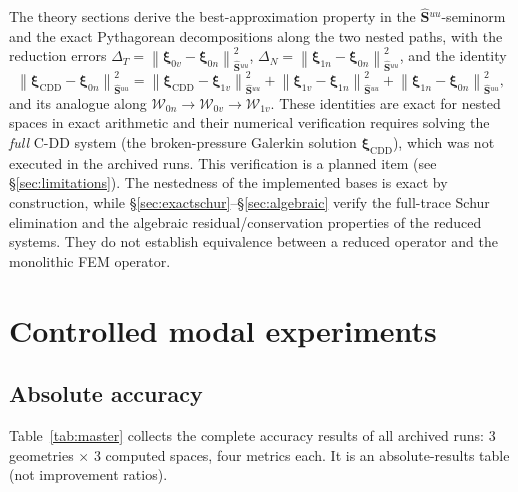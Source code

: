 \documentclass[11pt,a4paper]{article}
\newcommand{\Schur}{\mathbf{S}}
\newcommand{\Shatuu}{\widehat{\Schur}{}^{uu}}
\newcommand{\Wspace}{\mathcal{W}}
\newcommand{\xiX}[1]{\bm{\xi}_{#1}}
\newcommand{\norm}[1]{\left\|#1\right\|}
\begin{document}
The theory sections derive the best-approximation property in the
$\Shatuu$-seminorm and the exact Pythagorean decompositions along the
two nested paths, with the reduction errors
$\Delta_T=\norm{\xiX{0v}-\xiX{0n}}_{\Shatuu}^2$,
$\Delta_N=\norm{\xiX{1n}-\xiX{0n}}_{\Shatuu}^2$, and the identity
\begin{equation}
  \norm{\xiX{\mathrm{CDD}}-\xiX{0n}}_{\Shatuu}^2 =
  \norm{\xiX{\mathrm{CDD}}-\xiX{1v}}_{\Shatuu}^2
  + \norm{\xiX{1v}-\xiX{1n}}_{\Shatuu}^2
  + \norm{\xiX{1n}-\xiX{0n}}_{\Shatuu}^2,
\end{equation}
and its analogue along $\Wspace_{0n}\to\Wspace_{0v}\to\Wspace_{1v}$.
These identities are exact for nested spaces in exact arithmetic and
their numerical verification requires solving the \emph{full} C-DD
system (the broken-pressure Galerkin solution $\xiX{\mathrm{CDD}}$),
which was not executed in the archived runs.  This verification is a
planned item (see \S\ref{sec:limitations}).  The nestedness of the
implemented bases is exact by construction, while
\S\ref{sec:exactschur}--\S\ref{sec:algebraic} verify the full-trace
Schur elimination and the algebraic residual/conservation properties of
the reduced systems.  They do not establish equivalence between a
reduced operator and the monolithic FEM operator.

\section{Controlled modal experiments}
\label{sec:modal}

\subsection{Absolute accuracy}
\label{sec:accuracy}

Table~\ref{tab:master} collects the complete accuracy results of all
archived runs: 3 geometries $\times$ 3 computed spaces, four metrics
each.  It is an absolute-results table (not improvement ratios).
\end{document}
